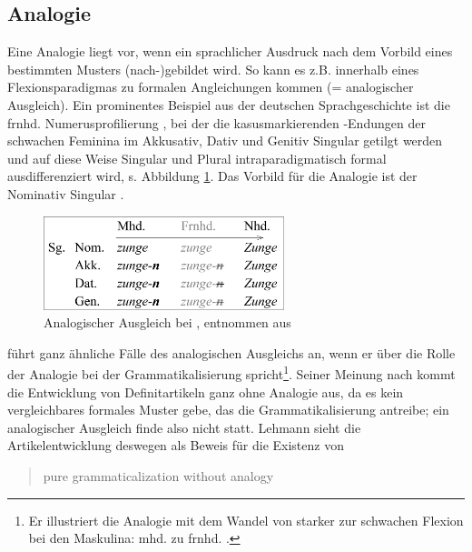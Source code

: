 \subsection{Analogie}\label{sec:analogie}

Eine Analogie liegt vor, wenn ein sprachlicher Ausdruck nach dem Vorbild eines bestimmten Musters (nach-)gebildet wird. So kann es z.B. innerhalb eines Flexionsparadigmas zu formalen Angleichungen kommen (= analogischer Ausgleich). Ein prominentes Beispiel aus der deutschen Sprachgeschichte ist die frnhd. Numerusprofilierung \parencite[1543]{Wegera2000a}, bei der die kasusmarkierenden -Endungen der schwachen Feminina im Akkusativ, Dativ und Genitiv Singular getilgt werden und auf diese Weise Singular und Plural intraparadigmatisch formal ausdifferenziert wird, s. Abbildung \ref{abb:zunge}. Das Vorbild für die Analogie ist der Nominativ Singular . 

\begin{figure}
\begin{center}
  \includegraphics[width=7cm]{images/zunge.jpg}
\caption {Analogischer Ausgleich bei , entnommen aus \textcite[24]{Wegera2012}} 
\label{abb:zunge}
\end{center}
\end{figure} 

\textcite[160]{Lehmann2004} führt ganz ähnliche Fälle des analogischen Ausgleichs an, wenn er über die Rolle der Analogie bei der Grammatikalisierung spricht\footnote{Er illustriert die Analogie mit dem  Wandel von starker zur schwachen Flexion bei den Maskulina: mhd.  zu frnhd. .}. Seiner Meinung nach kommt die Entwicklung von Definitartikeln ganz ohne Analogie aus, da es kein vergleichbares formales Muster gebe, das die Grammatikalisierung  antreibe; ein analogischer Ausgleich finde also nicht statt. Lehmann sieht die Artikelentwicklung deswegen als Beweis für die Existenz von \blockcquote[161]{Lehmann2004}{pure grammaticalization without analogy}. 

